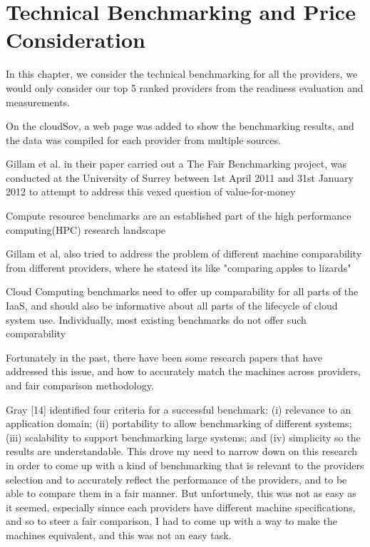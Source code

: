 \chapter{Technical Benchmarking and Price Consideration}

In this chapter, we consider the technical benchmarking for all the providers, we would only consider our top 5 ranked providers from the readiness evaluation and measurements. 

On the cloudSov, a web page was added to show the benchmarking results, and the data was compiled for each provider from multiple sources. 

Gillam et al. in their paper carried out a The Fair Benchmarking project, was conducted at the University of Surrey between 1st April 2011 and 31st January 2012 to attempt to address this vexed question of value-for-money

Compute resource benchmarks are an established part of the high performance computing(HPC) research landscape

Gillam et al, also tried to address the problem of different machine comparability from different providers, where he stateed its like "comparing apples to lizards" 

Cloud Computing benchmarks need to offer up comparability for all parts of the IaaS, and should also be informative about all parts of the lifecycle of cloud system use. Individually, most existing benchmarks do not offer such comparability


Fortunately in the past, there have been some research papers that have addressed this issue, and how to accurately match the machines across providers, and fair comparison methodology. 

Gray [14] identified four criteria for a successful benchmark: (i) relevance to an application domain; (ii) portability to
allow benchmarking of different systems; (iii) scalability to support benchmarking large systems; and (iv) simplicity so the results are understandable. This drove my need to narrow down on this research in order to come up with a kind of benchmarking that is relevant to the providers selection and to accurately reflect the performance of the providers, and to be able to compare them in a fair manner. But unfortunely, this was not as easy as it seemed, especially sinnce each providers have different machine specifications, and so to steer a fair comparison, I had to come up with a way to make the machines equivalent, and this was not an easy task.

